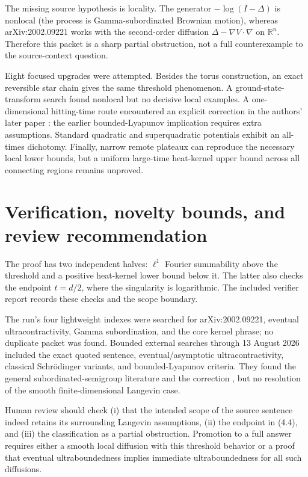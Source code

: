 \documentclass[11pt]{article}
\theoremstyle{remark}
\newcommand{\R}{\mathbb R}
\begin{document}
The missing source hypothesis is locality.  The generator
$-\log(I-\Delta)$ is nonlocal (the process is Gamma-subordinated Brownian
motion), whereas arXiv:2002.09221 works with the second-order diffusion
$\Delta-\nabla V\cdot\nabla$ on $\R^n$.  Therefore this packet is a sharp
partial obstruction, not a full counterexample to the source-context
question.

Eight focused upgrades were attempted.  Besides the torus construction, an
exact reversible star chain gives the same threshold phenomenon.  A
ground-state-transform search found nonlocal but no decisive local examples.
A one-dimensional hitting-time route encountered an explicit correction in
the authors' later paper \cite{CG}: the earlier bounded-Lyapunov implication
requires extra assumptions.  Standard quadratic and superquadratic
potentials exhibit an all-times dichotomy.  Finally, narrow remote plateaux
can reproduce the necessary local lower bounds, but a uniform large-time
heat-kernel upper bound across all connecting regions remains unproved.

\section{Verification, novelty bounds, and review recommendation}

The proof has two independent halves: $\ell^1$ Fourier summability above the
threshold and a positive heat-kernel lower bound below it.  The latter also
checks the endpoint $t=d/2$, where the singularity is logarithmic.  The
included verifier report records these checks and the scope boundary.

The run's four lightweight indexes were searched for arXiv:2002.09221,
eventual ultracontractivity, Gamma subordination, and the core kernel phrase;
no duplicate packet was found.  Bounded external searches through
13 August 2026 included the exact quoted sentence, eventual/asymptotic
ultracontractivity, classical Schr\"odinger variants, and bounded-Lyapunov
criteria.  They found the general subordinated-semigroup literature
\cite{BCS,GM} and the correction \cite{CG}, but no resolution of the smooth
finite-dimensional Langevin case.

Human review should check (i) that the intended scope of the source sentence
indeed retains its surrounding Langevin assumptions, (ii) the endpoint in
(4.4), and (iii) the classification as a partial obstruction.  Promotion to
a full answer requires either a smooth local diffusion with this threshold
behavior or a proof that eventual ultraboundedness implies immediate
ultraboundedness for all such diffusions.
\end{document}
